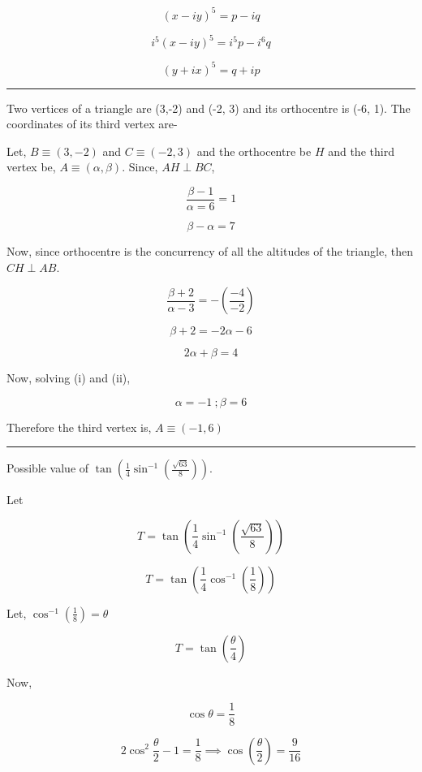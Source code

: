 \documentclass[twocolumn]{article}
\begin{document}
\begin{CJK*}{UTF8}{gbsn}
\[
    (x - iy)^5 = p - iq
\]

\[
    i^5 (x - iy)^5 = i^5 p - i^6 q
\]

\[
    \boxed{(y + ix)^5 = q + ip}
\]

\hrule 

\begin{question}
    Two vertices of a triangle are (3,-2) and (-2, 3) and its orthocentre is (-6, 1). The coordinates of its third vertex are-
\end{question}

Let, \(B \equiv (3, -2)\) and \(C \equiv (-2, 3)\) and the orthocentre be \(H\) and the third vertex be, \(A \equiv (\alpha , \beta )\). Since, \(AH \perp BC\), 

\[
    \frac{\beta  -1}{\alpha = 6} = 1
\]

\[
    \beta - \alpha = 7 \tag{i}
\]

Now, since orthocentre is the concurrency of all the altitudes of the triangle, then \(CH \perp AB\).

\[
    \frac{\beta +2}{\alpha - 3} = - (\frac{-4}{-2})
\]

\[
    \beta + 2 = -2\alpha - 6
\]

\[
    2\alpha + \beta = 4 \tag{ii}
\]

Now, solving (i) and (ii), 

\[
    \alpha = -1 \ ; \beta = 6
\]

Therefore the third vertex is, \(\boxed{A \equiv (-1, 6)}\) 

\vspace*{0.1in}

\hrule 

\begin{question}
    Possible value of \(\displaystyle \tan (\frac{1}{4}\sin^{-1}(\frac{\sqrt{63}}{8}))\). 
\end{question}

Let 

\[
    T = \tan (\frac{1}{4}\sin^{-1}(\frac{\sqrt{63}}{8}))
\]

\[
    T = \tan (\frac{1}{4} \cos^{-1}(\frac{1}{8}) )
\]

Let, \(\cos^{-1}(\frac{1}{8})= \theta \) 

\[
    T = \tan (\frac{\theta}{4})
\]

Now, 

\[
    \cos \theta = \frac{1}{8}
\]

\[
    2\cos ^{2} \frac{\theta}{2} - 1 = \frac{1}{8} \implies  \cos (\frac{\theta}{2}) = \frac{9}{16} 
\]


\end{CJK*}
\end{document}
